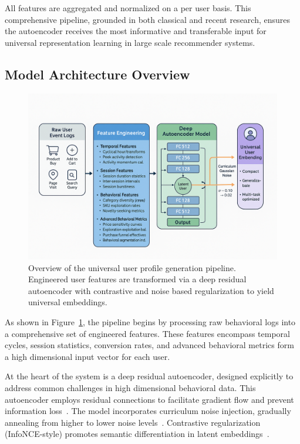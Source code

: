 \documentclass[sigconf]{acmart}
\begin{document}
All features are aggregated and normalized on a per user basis. This comprehensive pipeline, grounded in both classical and recent research, ensures the autoencoder receives the most informative and transferable input for universal representation learning in large scale recommender systems.


\subsection{Model Architecture Overview}
\begin{figure}[t]
  \centering
  \includegraphics[width=0.9\linewidth]{high.png}
  \caption{Overview of the universal user profile generation pipeline. Engineered user features are transformed via a deep residual autoencoder with contrastive and noise based regularization to yield universal embeddings.}
  \label{fig:architecture}
\end{figure}

As shown in Figure~\ref{fig:architecture}, the pipeline begins by processing raw behavioral logs into a comprehensive set of engineered features. These features encompass temporal cycles, session statistics, conversion rates, and advanced behavioral metrics form a high dimensional input vector for each user.

At the heart of the system is a deep residual autoencoder, designed explicitly to address common challenges in high dimensional behavioral data. This autoencoder employs residual connections to facilitate gradient flow and prevent information loss~\cite{He2016ResNet,Mao2016}. The model incorporates curriculum noise injection, gradually annealing from higher to lower noise levels~\cite{Bengio2009Curriculum,Sajjadi2016NoiseAnneal}. Contrastive regularization (InfoNCE-style) promotes semantic differentiation in latent embeddings~\cite{Oord2018,Zhou2020S3Rec}.
\end{document}
